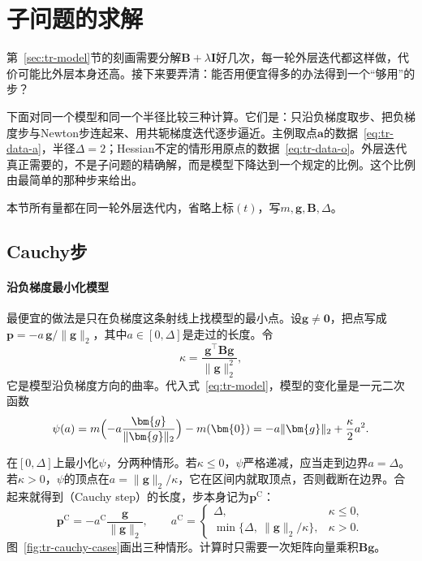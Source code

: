 \section{子问题的求解}
\label{sec:tr-subproblem}

第~\ref{sec:tr-model}节的刻画需要分解$\bm{B}+\lambda\bm{I}$好几次，每一轮外层迭代都这样做，代价可能比外层本身还高。接下来要弄清：能否用便宜得多的办法得到一个“够用”的步？

下面对同一个模型和同一个半径比较三种计算。它们是：只沿负梯度取步、把负梯度步与Newton步连起来、用共轭梯度迭代逐步逼近。主例取点$\bm{a}$的数据~\eqref{eq:tr-data-a}，半径$\Delta=2$；Hessian不定的情形用原点的数据~\eqref{eq:tr-data-o}。外层迭代真正需要的，不是子问题的精确解，而是模型下降达到一个规定的比例。这个比例由最简单的那种步来给出。

本节所有量都在同一轮外层迭代内，省略上标$(t)$，写$m,\bm{g},\bm{B},\Delta$。

\subsection{Cauchy步}
\label{sec:tr-cauchy}

\paragraph{沿负梯度最小化模型}
最便宜的做法是只在负梯度这条射线上找模型的最小点。设$\bm{g}\neq\bm{0}$，把点写成$\bm{p}=-a\,\bm{g}/\lVert\bm{g}\rVert_2$，其中$a\in[0,\Delta]$是走过的长度。令
\[
 \kappa=\frac{\bm{g}^\top\bm{B}\bm{g}}{\lVert\bm{g}\rVert_2^2},
\]
它是模型沿负梯度方向的曲率。代入式~\eqref{eq:tr-model}，模型的变化量是一元二次函数
\begin{equation}
 \psi(a)=m\Bigl(-a\frac{\bm{g}}{\lVert\bm{g}\rVert_2}\Bigr)-m(\bm{0})=-a\lVert\bm{g}\rVert_2+\frac{\kappa}{2}a^2.
 \label{eq:tr-cauchy-psi}
\end{equation}

在$[0,\Delta]$上最小化$\psi$，分两种情形。若$\kappa\leq0$，$\psi$严格递减，应当走到边界$a=\Delta$。若$\kappa>0$，$\psi$的顶点在$a=\lVert\bm{g}\rVert_2/\kappa$，它在区间内就取顶点，否则截断在边界。合起来就得到（Cauchy step）的长度，步本身记为$\bm{p}^{\mathrm{C}}$：
\begin{equation}
 \bm{p}^{\mathrm{C}}=-a^{\mathrm{C}}\frac{\bm{g}}{\lVert\bm{g}\rVert_2},\qquad
 a^{\mathrm{C}}=
 \begin{cases}
  \Delta,&\kappa\leq0,\\
  \min\{\Delta,\ \lVert\bm{g}\rVert_2/\kappa\},&\kappa>0.
 \end{cases}
 \label{eq:tr-cauchy-step}
\end{equation}
图~\ref{fig:tr-cauchy-cases}画出三种情形。计算时只需要一次矩阵向量乘积$\bm{B}\bm{g}$。

